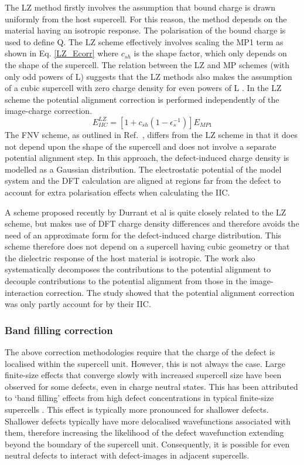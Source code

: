 \documentclass[11pt, twoside]{report}
\begin{document}
The LZ method firstly involves the assumption that bound charge is drawn uniformly from the host supercell. For this reason, the method depends on the material having an isotropic response. The polarisation of the bound charge is used to define Q. The LZ scheme effectively involves scaling the MP1 term as shown in Eq. \ref{LZ_Ecorr} where $c_{sh}$ is the shape factor, which only depends on the shape of the supercell. The relation between the LZ and MP schemes (with only odd powers of L) suggests that the LZ methods also makes the assumption of a cubic supercell with zero charge density for even powers of L \cite{Durrant_defects}. In the LZ scheme the potential alignment correction is performed independently of the image-charge correction.
\begin{equation}\label{LZ_Ecorr}
E_{IIC}^{LZ} = [1 + c_{sh} (1 - \epsilon_s^{-1}) ] E_{MP1}
\end{equation}
The FNV scheme, as outlined in Ref.~, differs from the LZ scheme in that it does not depend upon the shape of the supercell and does not involve a separate potential alignment step. In this approach, the defect-induced charge density is modelled as a Gaussian distribution. The electrostatic potential of the model system and the DFT calculation are aligned at regions far from the defect to account for extra polarisation effects when calculating the IIC.

A scheme proposed recently by Durrant et al \cite{Durrant_defects} is quite closely related to the LZ scheme, but makes use of DFT charge density differences and therefore avoids the need of an approximate form for the defect-induced charge distribution. This scheme therefore does not depend on a supercell having cubic geometry or that the dielectric response of the host material is isotropic. The work also systematically decomposes the contributions to the potential alignment to decouple contributions to the potential alignment from those in the image-interaction correction. The study showed that the potential alignment correction was only partly account for by their IIC.


\subsubsection{Band filling correction}

The above correction methodologies require that the charge of the defect is localised within the supercell unit. However, this is not always the case. Large finite-size effects that converge slowly with increased supercell size have been observed for some defects, even in charge neutral states. This has been attributed to ‘band filling’ effects from high defect concentrations in typical finite-size supercells \cite{Lany_defects_2008, CIS_defects, pylada}. This effect is typically more pronounced for shallower defects. Shallower defects typically have more delocalised wavefunctions associated with them, therefore increasing the likelihood of the defect wavefunction extending beyond the boundary of the supercell unit. Consequently, it is possible for even neutral defects to interact with defect-images in adjacent supercells. 
\end{document}

